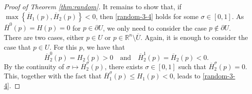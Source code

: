 \documentclass[12pt,reqno]{amsart}
\theoremstyle{plain}
\theoremstyle{remark}
\numberwithin{equation}{section}
\newcommand{\R}{\mathbb{R}}
\newcommand{\sig}{\sigma}
\newcommand{\ol}{\overline}
\begin{document}
\begin{proof}[Proof of Theorem \ref{thm:random}]
It remains to show that, if $\max\left\{\ol{H}_1(p), \ol{H}_2(p) \right\} <0$, then \eqref{random-3-4} holds for some $\sig \in [0,1]$.
As $\ol{H}^0(p)= H(p)=0$ for $p \in \partial U$, we only need to consider the case $p \notin \partial U$.
There are two cases, either $p \in U$ or $p\in \R^n \setminus \ol{U}$.
Again, it is enough to consider the case that $p \in U$.
For this $p$, we have that
\[
\ol{H}_2^0(p) = H_2(p)>0 \quad \text{and} \quad \ol{H}_2^1(p)=\ol{H}_2(p) <0.
\]
By the continuity of $\sig \mapsto \ol{H}_2^\sig(p)$, there exists $\sig \in [0,1]$ such that $\ol{H}_2^\sig(p)=0$.
This, together with the fact that $\ol{H}_1^\sig(p)\leq  H_1(p)<0$,  leads to  \eqref{random-3-4}.
\end{proof}



\end{document}
